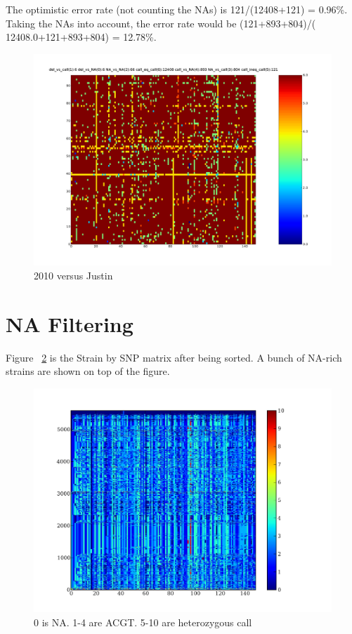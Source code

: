 \documentclass[a4paper,10pt]{article}
\begin{document}
The optimistic error rate (not counting the NAs) is 121/(12408+121) = 0.96\%. Taking the NAs into account, the error rate would be (121+893+804)/( 12408.0+121+893+804) = 12.78\%.

\begin{figure}
\includegraphics[width=1\textwidth]{figures/snp_matrix_2010_justin_149snps_vs_justin_data_y.png}
\caption{2010 versus Justin}\label{f0}
\end{figure}


\section{NA Filtering}
Figure ~\ref{f10} is the Strain by SNP matrix after being sorted. A bunch of NA-rich strains are shown on top of the figure.

\begin{figure}
\includegraphics[width=1\textwidth]{figures/data_sorted.png}
\caption{0 is NA. 1-4 are ACGT. 5-10 are heterozygous call}\label{f10}
\end{figure}
\end{document}
